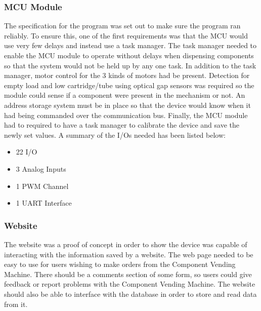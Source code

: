 \documentclass[a4paper,11pt]{article}
\numberwithin{figure}{section}
\numberwithin{table}{section}
\begin{document}
\subsubsection{MCU Module}
\label{subsec:mcuspec}
The specification for the program was set out to make sure the program ran reliably. To ensure this, one of the first requirements was that the MCU would use very few delays and instead use a task manager. The task manager needed to enable the MCU module to operate without delays when dispensing components so that the system would not be held up by any one task. In addition to the task manager, motor control for the 3 kinds of motors had be present. Detection for empty load and low cartridge/tube using optical gap sensors was required so the module could sense if a component were present in the mechanism or not. An address storage system must be in place so that the device would know when it had being commanded over the communication bus. Finally, the MCU module had to required to have a task manager to calibrate the device and save the newly set values. A summary of the I/Os needed has been listed below:
	
	\begin{itemize}
	\setlength\itemsep{0em}
	\item 22 I/O
	\item 3 Analog Inputs
	\item 1 PWM Channel
	\item 1 UART Interface		
	\end{itemize}
	
\subsubsection{Website}
The website was a proof of concept in order to show the device was capable of interacting with the information saved by a website. The web page needed to be easy to use for users wishing to make orders from the Component Vending Machine. There should be a comments section of some form, so users could give feedback or report problems with the Component Vending Machine. The website should also be able to interface with the database in order to store and read data from it.

\newpage
\end{document}
